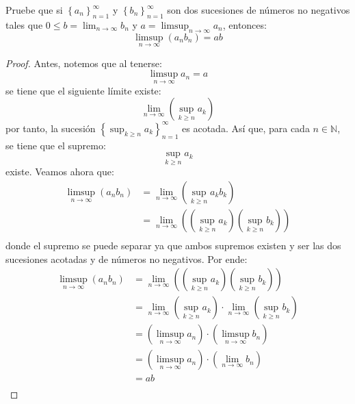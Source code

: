 \documentclass[12pt]{report}
\newcounter{it}
\theoremstyle{largebreak}
\begin{document}
    \begin{excer}
        \label{productoSucesionesLimSupLim}
        Pruebe que si $\left\{a_n\right\}_{ n=1}^\infty$ y $\left\{b_n\right\}_{ n=1}^\infty$ son dos sucesiones de números no negativos tales que $0\leq b=\lim_{ n\rightarrow\infty}b_n$ y $a=\limsup_{ n\rightarrow\infty}a_n$, entonces:
        \begin{equation*}
            \limsup_{ n\rightarrow\infty}(a_nb_n)=ab
        \end{equation*}
    \end{excer}

    \begin{proof}
        Antes, notemos que al tenerse:
        \begin{equation*}
            \limsup_{ n\rightarrow\infty}a_n=a
        \end{equation*}
        se tiene que el siguiente límite existe:
        \begin{equation*}
            \lim_{ n\rightarrow\infty}\left(\sup_{ k\geq n}a_k \right)
        \end{equation*}
        por tanto, la sucesión $\left\{\sup_{ k\geq n}a_k\right\}_{ n=1}^\infty$ es acotada. Así que, para cada $n\in\mathbb{N}$, se tiene que el supremo:
        \begin{equation*}
            \sup_{ k\geq n}a_k
        \end{equation*}
        existe. Veamos ahora que:
        \begin{equation*}
            \begin{split}
                \limsup_{ n\rightarrow\infty}(a_nb_n)&=\lim_{ n\rightarrow\infty}\left(\sup_{ k\geq n}a_kb_k \right)\\
                &=\lim_{ n\rightarrow\infty}\left(\left(\sup_{ k\geq n}a_k\right)\left(\sup_{ k\geq n}b_k\right) \right)\\
            \end{split}
        \end{equation*}
        donde el supremo se puede separar ya que ambos supremos existen y ser las dos sucesiones acotadas y de números no negativos. Por ende:
        \begin{equation*}
            \begin{split}
                \limsup_{ n\rightarrow\infty}(a_nb_n)&=\lim_{ n\rightarrow\infty}\left(\left(\sup_{ k\geq n}a_k\right)\left(\sup_{ k\geq n}b_k\right) \right)\\
                &=\lim_{ n\rightarrow\infty}\left(\sup_{ k\geq n} a_k\right)\cdot\lim_{ n\rightarrow\infty}\left(\sup_{ k\geq n}b_k\right)\\
                &=\left(\limsup_{ n\rightarrow\infty}a_n\right)\cdot\left(\limsup_{ n\rightarrow\infty}b_n\right)\\
                &=\left(\limsup_{ n\rightarrow\infty}a_n\right)\cdot\left(\lim_{ n\rightarrow\infty}b_n\right)\\
                &=ab\\
            \end{split}
        \end{equation*}
    \end{proof}
\end{document}
